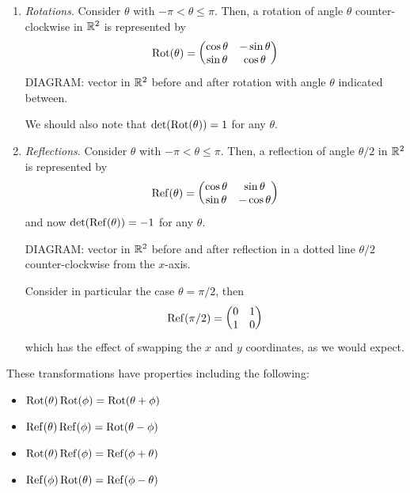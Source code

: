 \documentclass{../../template/note}
\begin{document}
    \begin{enumerate}
        \item \emph{Rotations}. Consider \(\theta\) with \(-\pi < \theta \leq \pi\). Then, a rotation of angle \(\theta\) counter-clockwise in \(\mathbb R^2\) is represented by
        \[
            \operatorname{Rot}(\theta) = \begin{pmatrix}
             \cos \theta & -\sin \theta \\
             \sin \theta & \cos \theta \\
            \end{pmatrix}
        \]
        DIAGRAM: vector in \(\mathbb R^2\) before and after rotation with angle \(\theta\) indicated between.
        
        We should also note that \(\det(\operatorname{Rot}(\theta)) = 1\) for any \(\theta\).
        \item \emph{Reflections}. Consider \(\theta\) with \(-\pi < \theta \leq \pi\). Then, a reflection of angle \(\theta/2\) in \(\mathbb R^2\) is represented by
        \[
            \operatorname{Ref}(\theta) = \begin{pmatrix}
             \cos \theta & \sin \theta \\
             \sin \theta & -\cos \theta \\
            \end{pmatrix}
        \]
        and now \(\det(\operatorname{Ref}(\theta)) = -1\) for any \(\theta\).

        DIAGRAM: vector in \(\mathbb R^2\) before and after reflection in a dotted line \(\theta/2\) counter-clockwise from the \(x\)-axis.

        Consider in particular the case \(\theta = \pi/2\), then
        \[
            \operatorname{Ref}(\pi/2) = \begin{pmatrix}
             0 & 1 \\
             1 & 0 \\
            \end{pmatrix}
        \]
        which has the effect of swapping the \(x\) and \(y\) coordinates, as we would expect.
    \end{enumerate}
    
    
    These transformations have properties including the following:

    \begin{itemize}
        \item \(\operatorname{Rot}(\theta)\operatorname{Rot}(\phi) = \operatorname{Rot}(\theta + \phi)\)
        \item \(\operatorname{Ref}(\theta)\operatorname{Ref}(\phi) = \operatorname{Rot}(\theta - \phi)\)
        \item \(\operatorname{Rot}(\theta)\operatorname{Ref}(\phi) = \operatorname{Ref}(\phi + \theta)\)
        \item \(\operatorname{Ref}(\phi)\operatorname{Rot}(\theta) = \operatorname{Ref}(\phi - \theta)\)
    \end{itemize}
\end{document}
